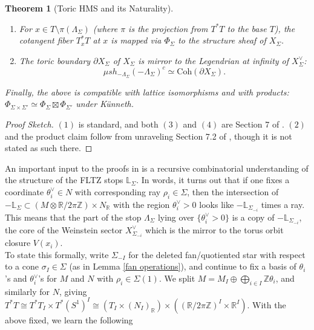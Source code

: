\documentclass[11pt]{amsart}
\newtheorem{thm}{Theorem}[section]
\theoremstyle{definition}
\theoremstyle{remark}
\newcommand{\Coh}{\mathrm{Coh}}
\numberwithin{equation}{section}
\begin{document}
\begin{thm}[Toric HMS and its Naturality]
\begin{enumerate}
\noindent intertwining closed restriction and the right adjoint. Further, in this case the functor $\iota_I^R$ is identified with the microlocalization functor between the corresponding microsheaf categories. These diagrams are natural in inclusions of cones.
\item For $x \in T \setminus \pi(\Lambda_{\Sigma})$ (where $\pi$ is the projection from $T^* T$ to the base $T$), the cotangent fiber $T^*_x T$ at $x$ is mapped via $\Phi_\Sigma$ to the structure sheaf of $X_\Sigma$.

\item The toric boundary $\partial X_\Sigma$ of $X_\Sigma$ is mirror to the Legendrian at infinity of $X_\Sigma^\vee$: $$\mu sh_{-\Lambda_\Sigma} (-\Lambda_\Sigma)^c \simeq \Coh(\partial X_\Sigma).$$
\end{enumerate}

Finally, the above is compatible with lattice isomorphisms and with products: $\Phi_{\Sigma\times\Sigma'}\simeq\Phi_\Sigma\boxtimes\Phi_{\Sigma'}$ under Künneth.
\end{thm}

\begin{proof}[Proof Sketch]
    $(1)$ is standard, and both $(3)$ and $(4)$ are Section 7 of \cite{gammage2022mirror}. $(2)$ and the product claim follow from unraveling Section 7.2 of \cite{gammage2022mirror}, though it is not stated as such there.
\end{proof}

An important input to the proofs in \cite{gammage2022mirror} is a recursive combinatorial understanding of the structure of the FLTZ stops $\mathbb{L}_\Sigma$. In words, it turns out that if one fixes a coordinate $\theta_i^\vee \in N$ with corresponding ray $\rho_i \in \Sigma$, then the intersection of $-\mathbb{L}_\Sigma \subset (M \otimes \mathbb{R}/2\pi\mathbb{Z}) \times N_\mathbb{R}$ with the region $\theta_i^\vee > 0$ looks like $-\mathbb L_{\Sigma_{-i}}$ times a ray. This means that the part of the stop $\Lambda_\Sigma$ lying over $\{\theta_i^\vee>0\}$ is a copy of $-\mathbb L_{\Sigma_{-i}}$, the core of the Weinstein sector $X^\vee_{\Sigma_{-i}}$ which is the mirror to the torus orbit closure $V(x_i)$. \\

To state this formally, write $\Sigma_{-I}$ for the deleted fan/quotiented star with respect to a cone $\sigma_I \in \Sigma$ (as in Lemma \ref{fan operations}), and continue to fix a basis of $\theta_i$'s and $\theta_i^\vee$'s for $M$ and $N$ with $\rho_i \in \Sigma(1)$. We split $M=M_I\oplus\bigoplus_{i\in I}\mathbb Z\theta_i$, and similarly for $N$, giving $T^*T\cong T^*T_I\times T^*(S^1)^I\cong(T_I\times(N_I)_{\mathbb R})\times((\mathbb R/2\pi\mathbb Z)^I\times\mathbb R^I)$. With the above fixed, we learn the following
\end{document}
